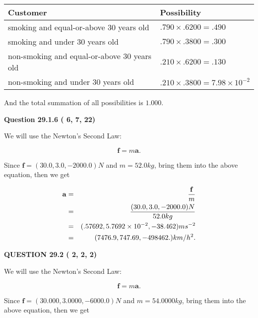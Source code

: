 \documentclass[12pt]{article}
\begin{document}
\noindent
\begin{tabular}{|l|l|}
\hline
Customer & Possibility \\
\hline
smoking  and  %
equal-or-above 30 years old  &
  $ %
.790 \times  %
.6200 =  %
.490$ \\
\hline
smoking  and  %
under 30 years old &
  $ %
.790 \times  %
.3800 =  %
.300$ \\
\hline
 non-smoking and  %
equal-or-above 30 years old  &
  $ %
.210 \times  %
.6200 =  %
.130$ \\
\hline
 non-smoking and  %
under 30 years old &
  $ %
.210 \times  %
.3800 =  %
7.98 \times 10^{-2}$ \\
\hline
\end{tabular}
 
\noindent
And the total summation of all possibilities is $  %
1.000 $.
 
 
 
 
  
\vspace{0.2in}
  
{\textbf{\Large{Question
29.1.6 
 (          6,          7,         22)
}}}
  
  
 
 

We will use the Newton's Second Law:
 
\[
\mathbf{f}=m\mathbf{a}.
\]
 
Since $\mathbf{f}=( %
30.0,  %
3.0,  %
-2000.0 )N$
and $m= %
52.0 kg$, bring them into the above equation, then we get
 
\begin{eqnarray*}
\mathbf{a}&=&\frac{\mathbf{f}}m  \\
&=&\frac{(
30.0 ,
3.0 ,
-2000.0 )N
}{ %
52.0 kg}  \\
&=&(
.57692 ,
5.7692 \times 10^{-2},
-38.462
)ms^{-2} \\
&=&(
7476.9 ,
747.69 ,
-498462.
)km/h^2.
\end{eqnarray*}
 
 
 
  
\vspace{0.2in}
  
{\textbf{\Large{QUESTION
29.2 
 (          2,          2,          2)
}}}
  
  
 
 

We will use the Newton's Second Law:
 
\[
\mathbf{f}=m\mathbf{a}.
\]
 
Since $\mathbf{f}=( %
30.000,  %
3.0000,  %
-6000.0 )N$
and $m= %
54.0000kg$, bring them into the above equation, then we get
 
\end{document}
